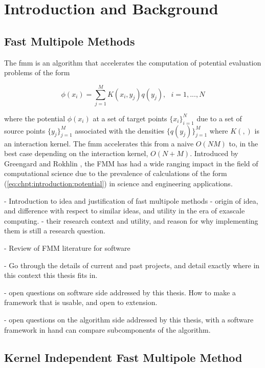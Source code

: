 \chapter{Introduction and Background}\label{chpt:introduction}
\thispagestyle{chaptertitle} %


\section{Fast Multipole Methods}


The \acrfull{fmm} is an algorithm that accelerates the computation of potential evaluation problems of the form

\begin{equation}
    \label{eq:chpt:introduction:potential}
    \phi(x_i) = \sum_{j=1}^M K(x_i, y_j) q(y_j), \> \> \> i=1,...,N
\end{equation}

where the potential $\phi(x_i)$ at a set of target points $\{ x_i \}_{i=1}^N$ due to a set of source points $\{ y_j \}_{j=1}^M$  associated with the densities $\{ q(y_j) \}_{j=1}^M$ where $K(,)$ is an interaction kernel. The \acrshort{fmm} accelerates this from a naive $O(NM)$ to, in the best case depending on the interaction kernel, $O(N + M)$. Introduced by Greengard and Rokhlin \cite{greengard1987fast}, the FMM has had a wide ranging impact in the field of computational science due to the prevalence of calculations of the form (\ref{eq:chpt:introduction:potential}) in science and engineering applications.

- Introduction to idea and justification of fast multipole methods
- origin of idea, and difference with respect to similar ideas, and utility in the era of exascale computing.
- their research context and utility, and reason for why implementing them is still a research question.

- Review of FMM literature for software

- Go through the details of current and past projects, and detail exactly where in this context this thesis fits in.

- open questions on software side addressed by this thesis. How to make a framework that is usable, and open to extension.

- open questions on the algorithm side addressed by this thesis, with a software framework in hand can compare subcomponents of the algorithm.

\section{Kernel Independent Fast Multipole Method}

